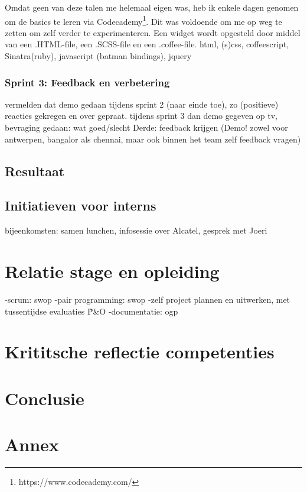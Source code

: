 \documentclass[10pt,a4paper]{article}
\begin{document}
Omdat geen van deze talen me helemaal eigen was, heb ik enkele dagen genomen om de basics te leren via Codecademy\footnote{https://www.codecademy.com/}. Dit was voldoende om me op weg te zetten om zelf verder te experimenteren. 
Een widget wordt opgesteld door middel van een .HTML-file, een .SCSS-file en een .coffee-file.
html, (s)css, coffeescript, Sinatra(ruby), javascript (batman bindings), jquery
\subsubsection{Sprint 3: Feedback en verbetering}
\label{sprint3}
vermelden dat demo gedaan tijdens sprint 2 (naar einde toe), zo (positieve) reacties gekregen en over gepraat. tijdens sprint 3 dan demo gegeven op tv, bevraging gedaan: wat goed/slecht
Derde: feedback krijgen (Demo! zowel voor antwerpen, bangalor als chennai, maar ook binnen het team zelf feedback vragen)
\subsection{Resultaat}
\subsection{Initiatieven voor interns}
bijeenkomsten: samen lunchen, infosessie over Alcatel, gesprek met Joeri
\section{Relatie stage en opleiding}
-scrum: swop
-pair programming: swop
-zelf project plannen en uitwerken, met tussentijdse evaluaties \~ P\&O
-documentatie: ogp
\section{Krititsche reflectie competenties}

\section{Conclusie}

\section{Annex}
\end{document}
